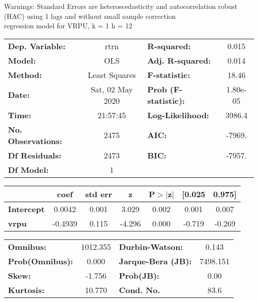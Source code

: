 Warnings: \newline
 [1] Standard Errors are heteroscedasticity and autocorrelation robust (HAC) using 1 lags and without small sample correction\\ 

regression model for VRPU, k = 1 h = 12\begin{center}
\begin{tabular}{lclc}
\toprule
\textbf{Dep. Variable:}    &       rtrn       & \textbf{  R-squared:         } &     0.015   \\
\textbf{Model:}            &       OLS        & \textbf{  Adj. R-squared:    } &     0.014   \\
\textbf{Method:}           &  Least Squares   & \textbf{  F-statistic:       } &     18.46   \\
\textbf{Date:}             & Sat, 02 May 2020 & \textbf{  Prob (F-statistic):} &  1.80e-05   \\
\textbf{Time:}             &     21:57:45     & \textbf{  Log-Likelihood:    } &    3986.4   \\
\textbf{No. Observations:} &        2475      & \textbf{  AIC:               } &    -7969.   \\
\textbf{Df Residuals:}     &        2473      & \textbf{  BIC:               } &    -7957.   \\
\textbf{Df Model:}         &           1      & \textbf{                     } &             \\
\bottomrule
\end{tabular}
\begin{tabular}{lcccccc}
                   & \textbf{coef} & \textbf{std err} & \textbf{z} & \textbf{P$> |$z$|$} & \textbf{[0.025} & \textbf{0.975]}  \\
\midrule
\textbf{Intercept} &       0.0042  &        0.001     &     3.029  &         0.002        &        0.001    &        0.007     \\
\textbf{vrpu}      &      -0.4939  &        0.115     &    -4.296  &         0.000        &       -0.719    &       -0.269     \\
\bottomrule
\end{tabular}
\begin{tabular}{lclc}
\textbf{Omnibus:}       & 1012.355 & \textbf{  Durbin-Watson:     } &    0.143  \\
\textbf{Prob(Omnibus):} &   0.000  & \textbf{  Jarque-Bera (JB):  } & 7498.151  \\
\textbf{Skew:}          &  -1.756  & \textbf{  Prob(JB):          } &     0.00  \\
\textbf{Kurtosis:}      &  10.770  & \textbf{  Cond. No.          } &     83.6  \\
\bottomrule
\end{tabular}
\end{center}


